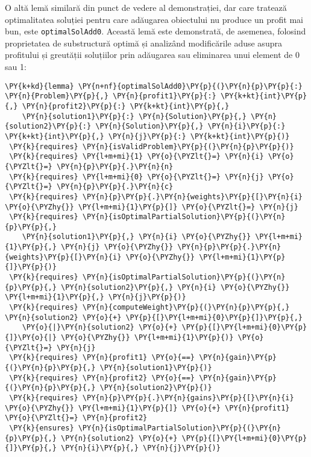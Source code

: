 \begin{sloppypar}
O altă lemă similară din punct de vedere al demonstrației, dar care tratează optimalitatea soluției pentru care adăugarea obiectului nu produce un profit mai bun, este \texttt{optimalSolAdd0}. Această lemă este demonstrată, de asemenea, folosind proprietatea de substructură optimă și analizând modificările aduse asupra profitului și greutății soluțiilor prin adăugarea sau eliminarea unui element de 0 sau 1:
\begin{Verbatim}[commandchars=\\\{\}]
\PY{k+kd}{lemma} \PY{n+nf}{optimalSolAdd0}\PY{p}{(}\PY{n}{p}\PY{p}{:} \PY{n}{Problem}\PY{p}{,} \PY{n}{profit1}\PY{p}{:} \PY{k+kt}{int}\PY{p}{,} \PY{n}{profit2}\PY{p}{:} \PY{k+kt}{int}\PY{p}{,} 
    \PY{n}{solution1}\PY{p}{:} \PY{n}{Solution}\PY{p}{,} \PY{n}{solution2}\PY{p}{:} \PY{n}{Solution}\PY{p}{,} \PY{n}{i}\PY{p}{:} \PY{k+kt}{int}\PY{p}{,} \PY{n}{j}\PY{p}{:} \PY{k+kt}{int}\PY{p}{)}
 \PY{k}{requires} \PY{n}{isValidProblem}\PY{p}{(}\PY{n}{p}\PY{p}{)}
 \PY{k}{requires} \PY{l+m+mi}{1} \PY{o}{\PYZlt{}=} \PY{n}{i} \PY{o}{\PYZlt{}=} \PY{n}{p}\PY{p}{.}\PY{n}{n}
 \PY{k}{requires} \PY{l+m+mi}{0} \PY{o}{\PYZlt{}=} \PY{n}{j} \PY{o}{\PYZlt{}=} \PY{n}{p}\PY{p}{.}\PY{n}{c}
 \PY{k}{requires} \PY{n}{p}\PY{p}{.}\PY{n}{weights}\PY{p}{[}\PY{n}{i} \PY{o}{\PYZhy{}} \PY{l+m+mi}{1}\PY{p}{]} \PY{o}{\PYZlt{}=} \PY{n}{j}
 \PY{k}{requires} \PY{n}{isOptimalPartialSolution}\PY{p}{(}\PY{n}{p}\PY{p}{,} 
    \PY{n}{solution1}\PY{p}{,} \PY{n}{i} \PY{o}{\PYZhy{}} \PY{l+m+mi}{1}\PY{p}{,} \PY{n}{j} \PY{o}{\PYZhy{}} \PY{n}{p}\PY{p}{.}\PY{n}{weights}\PY{p}{[}\PY{n}{i} \PY{o}{\PYZhy{}} \PY{l+m+mi}{1}\PY{p}{]}\PY{p}{)}
 \PY{k}{requires} \PY{n}{isOptimalPartialSolution}\PY{p}{(}\PY{n}{p}\PY{p}{,} \PY{n}{solution2}\PY{p}{,} \PY{n}{i} \PY{o}{\PYZhy{}} \PY{l+m+mi}{1}\PY{p}{,} \PY{n}{j}\PY{p}{)}
 \PY{k}{requires} \PY{n}{computeWeight}\PY{p}{(}\PY{n}{p}\PY{p}{,} \PY{n}{solution2} \PY{o}{+} \PY{p}{[}\PY{l+m+mi}{0}\PY{p}{]}\PY{p}{,} 
    \PY{o}{|}\PY{n}{solution2} \PY{o}{+} \PY{p}{[}\PY{l+m+mi}{0}\PY{p}{]}\PY{o}{|} \PY{o}{\PYZhy{}} \PY{l+m+mi}{1}\PY{p}{)} \PY{o}{\PYZlt{}=} \PY{n}{j}
 \PY{k}{requires} \PY{n}{profit1} \PY{o}{==} \PY{n}{gain}\PY{p}{(}\PY{n}{p}\PY{p}{,} \PY{n}{solution1}\PY{p}{)}
 \PY{k}{requires} \PY{n}{profit2} \PY{o}{==} \PY{n}{gain}\PY{p}{(}\PY{n}{p}\PY{p}{,} \PY{n}{solution2}\PY{p}{)}
 \PY{k}{requires} \PY{n}{p}\PY{p}{.}\PY{n}{gains}\PY{p}{[}\PY{n}{i} \PY{o}{\PYZhy{}} \PY{l+m+mi}{1}\PY{p}{]} \PY{o}{+} \PY{n}{profit1} \PY{o}{\PYZlt{}=} \PY{n}{profit2}
 \PY{k}{ensures} \PY{n}{isOptimalPartialSolution}\PY{p}{(}\PY{n}{p}\PY{p}{,} \PY{n}{solution2} \PY{o}{+} \PY{p}{[}\PY{l+m+mi}{0}\PY{p}{]}\PY{p}{,} \PY{n}{i}\PY{p}{,} \PY{n}{j}\PY{p}{)}

\end{Verbatim}
\end{sloppypar}

